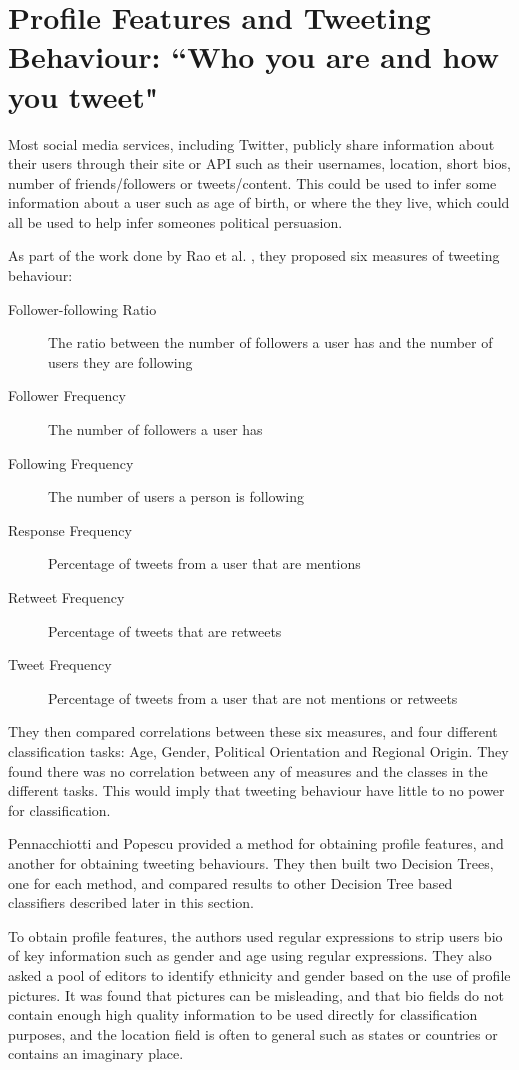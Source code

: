 \documentclass[bsc,frontabs,singlespacing,parskip]{infthesis}     %
\begin{document}
\section{Profile Features and Tweeting Behaviour: ``Who you are and how you tweet"}

Most social media services, including Twitter, publicly share information about their users through their site or API such as their usernames, location, short bios, number of friends/followers or tweets/content. This could be used to infer some information about a user such as age of birth, or where the they live, which could all be used to help infer someones political persuasion.


As part of the work done by Rao et al. \cite{rao2010}, they proposed six measures of tweeting behaviour:
\begin{description}
\item[Follower-following Ratio]The ratio between the number of followers a user has and the number of users they are following
\item[Follower Frequency] The number of followers a user has
\item[Following Frequency] The number of users a person is following
\item[Response Frequency] Percentage of tweets from a user that are mentions
\item[Retweet Frequency] Percentage of tweets that are retweets
\item[Tweet Frequency] Percentage of tweets from a user that are not mentions or retweets 
\end{description}

They then compared correlations between these six measures, and four different classification tasks: Age, Gender, Political Orientation and Regional Origin. They found there was no correlation between any of measures and the classes in the different tasks. This would imply that tweeting behaviour have little to no power for classification.

Pennacchiotti and Popescu \cite{yahoopaper} provided a method for obtaining profile features, and another for obtaining tweeting behaviours. They then built two Decision Trees, one for each method, and compared results to other Decision Tree based classifiers described later in this section. 

To obtain profile features, the authors used regular expressions to strip users bio of key information such as gender and age using regular expressions. They also asked a pool of editors to identify ethnicity and gender based on the use of profile pictures. It was found that pictures can be misleading, and that bio fields do not contain enough high quality information to be used directly for classification purposes, and the location field is often to general such as states or countries or contains an imaginary place. 
\end{document}

